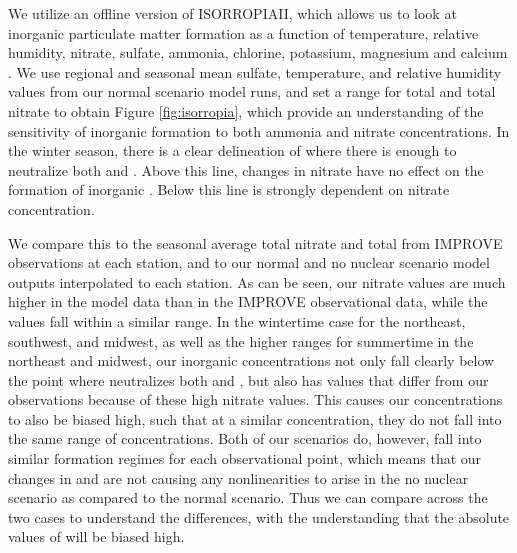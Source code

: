 \documentclass[12]{article}
\begin{document}
We utilize an offline version of ISORROPIAII, which allows us to look at inorganic particulate matter formation as a function of temperature, relative humidity, nitrate, sulfate, ammonia, chlorine, potassium, magnesium and calcium \citep{fountoukis_isorropia_2007}. We use regional and seasonal mean sulfate, temperature, and relative humidity values from our normal scenario model runs, and set a range for total  and total nitrate to obtain Figure \ref{fig:isorropia}, which provide an understanding of the sensitivity of inorganic  formation to both ammonia and nitrate concentrations. In the winter season, there is a clear delineation of where there is enough  to neutralize both  and . Above this line, changes in nitrate have no effect on the formation of inorganic . Below this line  is strongly dependent on nitrate concentration. 

We compare this to the seasonal average total nitrate and total  from IMPROVE observations at each station, and to our normal and no nuclear scenario model outputs interpolated to each station. As can be seen, our nitrate values are much higher in the model data than in the IMPROVE observational data, while the  values fall within a similar range. In the wintertime case for the northeast, southwest, and midwest, as well as the higher  ranges for summertime in the northeast and midwest, our inorganic  concentrations not only fall clearly below the point where  neutralizes both  and , but also has values that differ from our observations because of these high nitrate values. This causes our  concentrations to also be biased high, such that at a similar  concentration, they do not fall into the same range of  concentrations. Both of our scenarios do, however, fall into similar  formation regimes for each observational point, which means that our changes in  and  are not causing any nonlinearities to arise in the no nuclear scenario as compared to the normal scenario. Thus we can compare across the two cases to understand the differences, with the understanding that the absolute values of  will be biased high.
\end{document}
